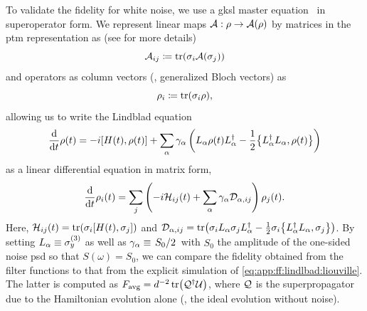 To validate the fidelity for white noise, we use a \gls{gksl} master equation~\cite{Lindblad1976,Gorini1976} in superoperator form.
We represent linear maps $\mathcal{A}: \rho\rightarrow\mathcal{A}(\rho)$ by matrices in the \gls{ptm} representation as (see  for more details)
\begin{equation}
    \mathcal{A}_{ij} \coloneqq \tr(\sigma_i\mathcal{A}(\sigma_j))
\end{equation}
and operators as column vectors (\ie, generalized Bloch vectors) as
\begin{equation}\label{eq:app:ff:bloch_vector}
    \rho_i \coloneqq \tr(\sigma_i\rho),
\end{equation}
allowing us to write the Lindblad equation
\begin{equation}\label{eq:app:ff:lindblad:hilbert}
\dv{t}\rho(t) = -\i\comm{H(t)}{\rho(t)} + \sum_\alpha \gamma_\alpha\left(L_\alpha\rho(t) L_\alpha\adjoint - \frac{1}{2}\acomm{L_\alpha\adjoint L_\alpha}{\rho(t)}\right)
\end{equation}
as a linear differential equation in matrix form,
\begin{equation}\label{eq:app:ff:lindlbad:liouville}
\dv{t}\rho_i(t) = \sum_j\left(-i\mathcal{H}_{ij}(t)+ \sum_\alpha \gamma_\alpha \mathcal{D}_{\alpha, ij}\right)\rho_j(t).
\end{equation}
Here, $\mc{H}_{ij}(t) = \tr(\sigma_i\comm{H(t)}{\sigma_j})$ and $\mc{D}_{\alpha, ij} = \tr(\sigma_i L_\alpha\sigma_j L_\alpha\adjoint - \frac{1}{2}\sigma_i \acomm{L_\alpha\adjoint L_\alpha}{\sigma_j})$.
By setting $L_\alpha\equiv\sigma_y^{(3)}$ as well as $\gamma_\alpha\equiv\flatfrac{S_0}{2}$ with $S_0$ the amplitude of the one-sided noise \gls{psd} so that $S(\omega) = S_0$, we can compare the fidelity obtained from the filter functions to that from the explicit simulation of \cref{eq:app:ff:lindlbad:liouville}.
The latter is computed as $F_{\mathrm{avg}} = d^{-2}\tr(\mathcal{Q}^\dagger\mathcal{U})$, where $\mathcal{Q}$ is the superpropagator due to the Hamiltonian evolution alone (\ie, the ideal evolution without noise).

